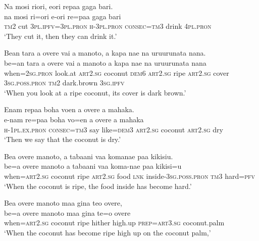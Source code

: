 \ea\label{ex:text01-43}
Na mosi riori, eori repaa gaga bari.\\
\gll na	mosi	ri=ori	e-ori	re=paa	gaga	bari\\
     \textsc{tm}2	cut	3\textsc{pl}.\textsc{ipfv}=3\textsc{pl}.\textsc{pron}	\textsc{h}-3\textsc{pl}.\textsc{pron}	\textsc{consec}=\textsc{tm}3	drink	4\textsc{pl}.\textsc{pron}\\
\glt `They cut it, then they can drink it.'
\z

\ea\label{ex:text01-44}
Bean tara a overe vai a manoto, a kapa nae na uruurunata nana.\\
\gll be=an	tara	a	overe	vai	a	manoto	a	kapa	nae	na	uruurunata	nana\\
     when=2\textsc{sg}.\textsc{pron}	look.at	\textsc{art}2.\textsc{sg}	coconut	\textsc{dem}6	\textsc{art}2.\textsc{sg}	ripe	\textsc{art}2.\textsc{sg}	cover	3\textsc{sg}.\textsc{poss}.\textsc{pron}	\textsc{tm}2	dark.brown	3\textsc{sg}.\textsc{ipfv}\\
\glt `When you look at a ripe coconut, its cover is dark brown.'
\z

\ea\label{ex:text01-45}
Enam repaa boha voen a overe a mahaka.\\
\gll e-nam	re=paa	boha	vo=en	a	overe	a	mahaka\\
     \textsc{h}-1\textsc{pl}.\textsc{ex}.\textsc{pron}	\textsc{consec}=\textsc{tm}3	say	like=\textsc{dem}3	\textsc{art}2.\textsc{sg}	coconut	\textsc{art}2.\textsc{sg}	dry\\
\glt `Then we say that the coconut is dry.'
\z

\ea\label{ex:text01-46}
Bea overe manoto, a tabaani vaa komanae paa kikisiu.\\
\gll be=a	overe	manoto	a	tabaani	vaa	koma-nae	paa	kikisi=u\\
     when=\textsc{art}2.\textsc{sg}	coconut	ripe	\textsc{art}2.\textsc{sg}	food	\textsc{lnk}	inside-3\textsc{sg}.\textsc{poss}.\textsc{pron}	\textsc{tm}3	hard=\textsc{pfv}\\
\glt `When the coconut is ripe, the food inside has become hard.'
\z

\newpage
\ea\label{ex:text01-47}
Bea overe manoto maa gina teo overe,\\
\gll be=a	overe	manoto	maa	gina	te=o	overe\\
     when=\textsc{art}2.\textsc{sg}	coconut	ripe	hither	high.up	\textsc{prep}=\textsc{art}3.\textsc{sg}	coconut.palm\\
\glt `When the coconut has become ripe high up on the coconut palm,'
\z

